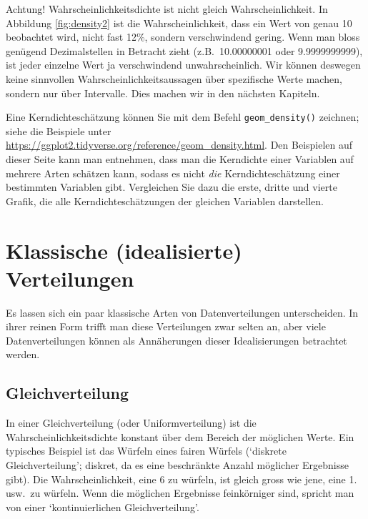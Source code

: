 \documentclass[oneside, 10pt]{book}\usepackage[]{graphicx}\usepackage[]{xcolor}
\begin{document}
Achtung! Wahrscheinlichkeitsdichte ist nicht gleich Wahrscheinlichkeit.
In Abbildung \ref{fig:density2} ist die
Wahrscheinlichkeit, dass ein Wert von genau 10
beobachtet wird, nicht fast 12\%, sondern verschwindend gering.
Wenn man bloss genügend Dezimalstellen in Betracht zieht (z.B.\ 10.00000001 oder
9.9999999999), ist jeder einzelne Wert ja verschwindend unwahrscheinlich. Wir können
deswegen keine sinnvollen Wahr\-schein\-lich\-keits\-aus\-sagen über spezifische Werte
machen, sondern nur über Intervalle. Dies machen wir in den nächsten Kapiteln.

Eine Kerndichteschätzung können Sie mit dem Befehl \texttt{geom\_density()} zeichnen; siehe die Beispiele unter \url{https://ggplot2.tidyverse.org/reference/geom_density.html}.
Den Beispielen auf dieser Seite kann man entnehmen, dass man die Kerndichte
einer Variablen auf mehrere Arten schätzen kann, sodass
es nicht \emph{die} Kerndichteschätzung einer bestimmten
Variablen gibt. Vergleichen Sie dazu die erste, dritte und
vierte Grafik, die alle Kerndichteschätzungen der gleichen
Variablen darstellen.

\section{Klassische (idealisierte) Verteilungen}\label{sec:distributions}
Es lassen sich ein paar klassische Arten von Datenverteilungen unterscheiden.
In ihrer reinen Form trifft man diese Verteilungen zwar selten an, aber viele
Datenverteilungen können als Annäherungen dieser Idealisierungen betrachtet werden.

\subsection{Gleichverteilung}
In einer Gleichverteilung (oder Uniformverteilung) ist die
Wahrscheinlichkeitsdichte konstant über dem Bereich der möglichen Werte.
Ein typisches Beispiel ist das Würfeln eines fairen
Würfels (`diskrete Gleichverteilung'; diskret, da es eine
beschränkte Anzahl möglicher
Ergebnisse gibt). Die Wahrscheinlichkeit, eine 6 zu würfeln, ist gleich gross wie
jene, eine 1. usw.\ zu würfeln. Wenn die möglichen Ergebnisse feinkörniger sind,
spricht man von einer `kontinuierlichen Gleichverteilung'.
\end{document}

